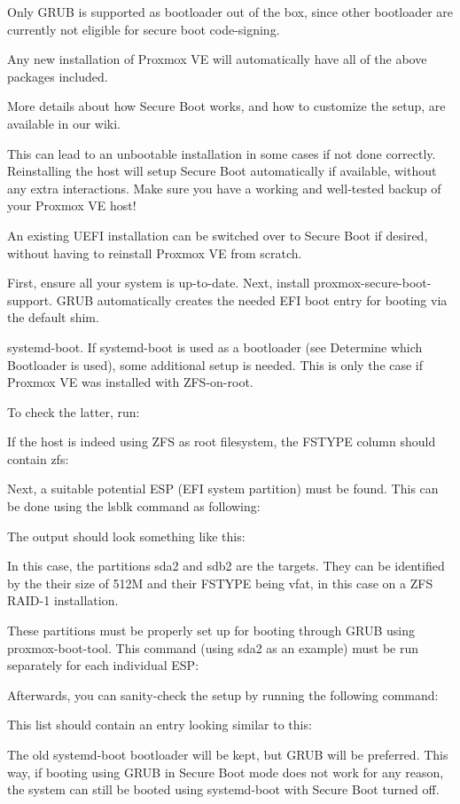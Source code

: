 Only GRUB is supported as bootloader out of the box, since other bootloader are currently not eligible for secure boot code-signing.

Any new installation of Proxmox VE will automatically have all of the above packages included.

More details about how Secure Boot works, and how to customize the setup, are available in our wiki.

This can lead to an unbootable installation in some cases if not done correctly. Reinstalling the host will setup Secure Boot automatically if available, without any extra interactions. Make sure you have a working and well-tested backup of your Proxmox VE host!

An existing UEFI installation can be switched over to Secure Boot if desired, without having to reinstall Proxmox VE from scratch.

First, ensure all your system is up-to-date. Next, install proxmox-secure-boot-support. GRUB automatically creates the needed EFI boot entry for booting via the default shim.

systemd-boot. If systemd-boot is used as a bootloader (see Determine which Bootloader is used), some additional setup is needed. This is only the case if Proxmox VE was installed with ZFS-on-root.

To check the latter, run:

If the host is indeed using ZFS as root filesystem, the FSTYPE column should contain zfs:

Next, a suitable potential ESP (EFI system partition) must be found. This can be done using the lsblk command as following:

The output should look something like this:

In this case, the partitions sda2 and sdb2 are the targets. They can be identified by the their size of 512M and their FSTYPE being vfat, in this case on a ZFS RAID-1 installation.

These partitions must be properly set up for booting through GRUB using proxmox-boot-tool. This command (using sda2 as an example) must be run separately for each individual ESP:

Afterwards, you can sanity-check the setup by running the following command:

This list should contain an entry looking similar to this:

The old systemd-boot bootloader will be kept, but GRUB will be preferred. This way, if booting using GRUB in Secure Boot mode does not work for any reason, the system can still be booted using systemd-boot with Secure Boot turned off.

